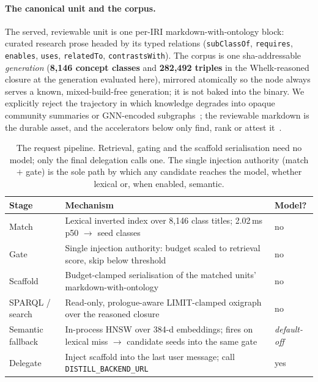 \documentclass[10pt,twocolumn]{article}
\begin{document}
\paragraph{The canonical unit and the corpus.} The served, reviewable unit is one per-IRI
markdown-with-ontology block: curated research prose headed by its typed relations
(\texttt{subClassOf}, \texttt{requires}, \texttt{enables}, \texttt{uses}, \texttt{relatedTo},
\texttt{contrastsWith}). The corpus is one sha-addressable \emph{generation} (\textbf{8{,}146
concept classes} and \textbf{282{,}492 triples} in the Whelk-reasoned closure at the generation
evaluated here), mirrored atomically so the node always serves a known, mixed-build-free generation;
it is not baked into the binary. We explicitly reject the trajectory in which knowledge degrades
into opaque community summaries or GNN-encoded subgraphs~\cite{edge2024graphrag,he2024gretriever};
the reviewable markdown is the durable asset, and the accelerators below only find, rank or attest
it~\cite{garcez2023neurosymbolic}.

\begin{table}[t]\centering\small
\caption{The request pipeline. Retrieval, gating and the scaffold serialisation need no model; only
the final delegation calls one. The single injection authority (match $+$ gate) is the sole path by
which any candidate reaches the model, whether lexical or, when enabled, semantic.}
\label{tab:pipeline}
\renewcommand{\arraystretch}{1.15}
\begin{tabularx}{\textwidth}{@{}>{\raggedright\arraybackslash}p{2.7cm} >{\raggedright\arraybackslash}X >{\centering\arraybackslash}p{2.2cm}@{}}
\toprule
Stage & Mechanism & Model? \\
\midrule
Match & Lexical inverted index over 8{,}146 class titles; 2.02\,ms p50 $\to$ seed classes & no \\
Gate & Single injection authority: budget scaled to retrieval score, skip below threshold & no \\
Scaffold & Budget-clamped serialisation of the matched units' markdown-with-ontology & no \\
SPARQL / search & Read-only, prologue-aware LIMIT-clamped oxigraph over the reasoned closure & no \\
Semantic fallback & In-process HNSW over 384-d embeddings; fires on lexical miss $\to$ candidate seeds into the same gate & \emph{default-off} \\
Delegate & Inject scaffold into the last user message; call \texttt{DISTILL\_BACKEND\_URL} & yes \\
\bottomrule
\end{tabularx}
\end{table}
\end{document}

